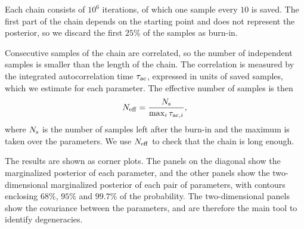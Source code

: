 Each chain consists of $10^6$ iterations, of which one sample every $10$ is
saved. The first part of the chain depends on the starting point and does not
represent the posterior, so we discard the first $25\%$ of the samples as
burn-in.

Consecutive samples of the chain are correlated, so the number of independent
samples is smaller than the length of the chain. The correlation is measured
by the integrated autocorrelation time $\tau_{\rm ac}$, expressed in units of
saved samples, which we estimate for each parameter. The effective number of
samples is then
\begin{equation}
    N_{\rm eff} = \frac{N_{\rm s}}{\max_i \tau_{{\rm ac},i}},
    \label{eq:neff}
\end{equation}
where $N_{\rm s}$ is the number of samples left after the burn-in and the
maximum is taken over the parameters. We use $N_{\rm eff}$ to check that the
chain is long enough.

The results are shown as corner plots. The panels on the diagonal show the
marginalized posterior of each parameter, and the other panels show the
two-dimensional marginalized posterior of each pair of parameters, with
contours enclosing $68\%$, $95\%$ and $99.7\%$ of the probability. The
two-dimensional panels show the covariance between the parameters, and are
therefore the main tool to identify degeneracies.

